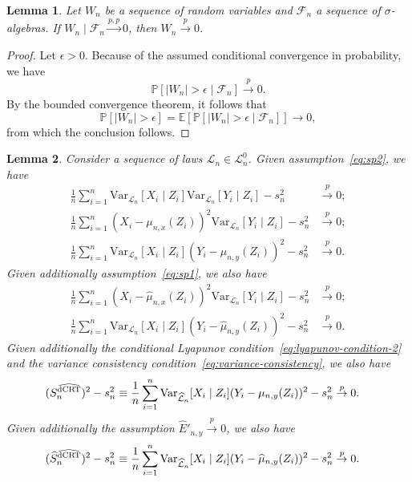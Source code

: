\documentclass[aos]{imsart}
\theoremstyle{plain}
\newtheorem{lemma}{Lemma}
\theoremstyle{remark}
\newcommand{\E}{\mathbb E}								%
\newcommand{\V}{\mathrm{Var}}							%
\renewcommand{\P}{\mathbb{P}}							%
\newcommand{\convp}{\overset p \rightarrow}             %
\newcommand{\srx}{X}									%
\newcommand{\srz}{Z}									%
\newcommand{\sry}{Y}									%
\newcommand{\law}{\mathcal L}							%
\newcommand{\nulllaws}{\mathscr L^0}					%
\newcommand{\lawhat}{\widehat{\mathcal L}}				%
\newcommand{\dCRThat}{\widehat{\textnormal{dCRT}}}		%
\newcommand{\convpp}{\overset {p,p} \longrightarrow}    %
\begin{document}
\begin{lemma} \label{lem:conditional-convergence-to-unconditional}
	Let $W_n$ be a sequence of random variables and $\mathcal F_n$ a sequence of $\sigma$-algebras. If $W_n \mid \mathcal F_n \convpp 0$, then $W_n \convp 0$. 
\end{lemma}

\begin{proof}
	Let $\epsilon > 0$. Because of the assumed conditional convergence in probability, we have
	\begin{equation*}
	\P[|W_n| > \epsilon \mid \mathcal F_n] \convp 0.
	\end{equation*}
	By the bounded convergence theorem, it follows that
	\begin{equation*}
	\P[|W_n| > \epsilon] = \E[\P[|W_n| > \epsilon \mid \mathcal F_n]] \rightarrow 0,
	\end{equation*}
	from which the conclusion follows.
\end{proof}

\begin{lemma}
	\label{lem:variance_convg}
	Consider a sequence of laws $\law_n \in \nulllaws_n$. Given assumption~\eqref{eq:sp2}, we have
	\begin{align}
	\frac{1}{n} \sum_{i=1}^n \V_{\law_n}[\srx_i\mid \srz_i]\V_{\law_n}[\sry_i \mid \srz_i] -s^2_n &\convp 0; \label{eq:variance_convg_1} \\ 
	\frac{1}{n}\sum_{i = 1}^n (\srx_i - \mu_{n,x}(\srz_i))^2\V_{\law_n}[\sry_i\mid\srz_i]-s^2_n &\convp 0; \label{eq:variance_convg_2} \\
	\frac{1}{n}\sum_{i = 1}^n \V_{\law_n}[\srx_i\mid\srz_i](\sry_i - \mu_{n,y}(\srz_i))^2-s^2_n &\convp 0. \label{eq:variance_convg_3}
	\end{align}
	Given additionally assumption~\eqref{eq:sp1}, we also have
	\begin{align}
	\frac{1}{n} \sum_{i = 1}^n (\srx_i - \widehat \mu_{n,x}(\srz_i))^2\V_{\law_n}[\sry_i\mid\srz_i] - s^2_n &\convp 0; \label{eq:variance_convg_4} \\
	\frac{1}{n}\sum_{i = 1}^n \V_{\law_n}[\srx_i\mid\srz_i](\sry_i - \widehat \mu_{n,y}(\srz_i))^2-s^2_n &\convp 0. \label{eq:variance_convg_5}
	\end{align}
	Given additionally the conditional Lyapunov condition~\eqref{eq:lyapunov-condition-2} and the variance consistency condition~\eqref{eq:variance-consistency}, we also have
	\begin{align}
	(S^{\dCRThat}_n)^2 - s_n^2 \equiv \frac{1}{n}\sum_{i = 1}^n \V_{\lawhat_n}[\srx_i\mid\srz_i](\sry_i - \mu_{n,y}(\srz_i))^2-s^2_n &\convp 0. \label{eq:variance_convg_6}
	\end{align}
	Given additionally the assumption $\widehat E'_{n,y} \convp 0$, we also have
	\begin{align}
		(\widehat S^{\dCRThat}_n)^2 - s_n^2 \equiv \frac{1}{n}\sum_{i = 1}^n \V_{\lawhat_n}[\srx_i\mid\srz_i](\sry_i - \widehat \mu_{n,y}(\srz_i))^2-s^2_n &\convp 0. \label{eq:variance_convg_7}
	\end{align}

\end{lemma}
\end{document}

